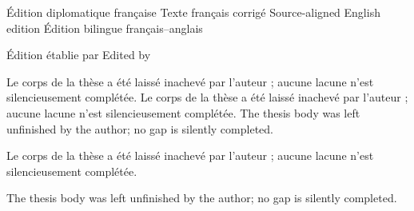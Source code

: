 \newcommand{\VerdierWorkTitle}{Des catégories dérivées des catégories abéliennes}
\newcommand{\VerdierWorkAuthor}{Jean-Louis Verdier}
\newcommand{\VerdierWorkEditor}{Georges Maltsiniotis}
\newcommand{\VerdierPublication}{Astérisque 239 (1996)}

\expandafter\def\csname VerdierLayerLabel-fr-diplomatic\endcsname{Édition diplomatique française}
\expandafter\def\csname VerdierLayerLabel-fr-corrected\endcsname{Texte français corrigé}
\expandafter\def\csname VerdierLayerLabel-english\endcsname{Source-aligned English edition}
\expandafter\def\csname VerdierLayerLabel-bilingual\endcsname{Édition bilingue français--anglais}

\expandafter\def\csname VerdierEditorLabel-french\endcsname{Édition établie par}
\expandafter\def\csname VerdierEditorLabel-english\endcsname{Edited by}

\expandafter\def\csname VerdierUnfinishedNotice-fr-diplomatic\endcsname{Le corps de la thèse a été laissé inachevé par l'auteur ; aucune lacune n'est silencieusement complétée.}
\expandafter\def\csname VerdierUnfinishedNotice-fr-corrected\endcsname{Le corps de la thèse a été laissé inachevé par l'auteur ; aucune lacune n'est silencieusement complétée.}
\expandafter\def\csname VerdierUnfinishedNotice-english\endcsname{The thesis body was left unfinished by the author; no gap is silently completed.}
\expandafter\def\csname VerdierUnfinishedNotice-bilingual\endcsname{Le corps de la thèse a été laissé inachevé par l'auteur ; aucune lacune n'est silencieusement complétée.\par\medskip The thesis body was left unfinished by the author; no gap is silently completed.}

\newcommand{\VerdierLayerLabel}{%
  \ifcsname VerdierLayerLabel-\VerdierReaderLayer\endcsname
    \csname VerdierLayerLabel-\VerdierReaderLayer\endcsname
  \else
    \VerdierReaderLayer
  \fi
}

\newcommand{\VerdierEditorLabel}{%
  \ifcsname VerdierEditorLabel-\VerdierReaderLanguage\endcsname
    \csname VerdierEditorLabel-\VerdierReaderLanguage\endcsname
  \else
    Edited by
  \fi
}

\newcommand{\VerdierUnfinishedNotice}{%
  \ifcsname VerdierUnfinishedNotice-\VerdierReaderLayer\endcsname
    \csname VerdierUnfinishedNotice-\VerdierReaderLayer\endcsname
  \fi
}

\endinput
